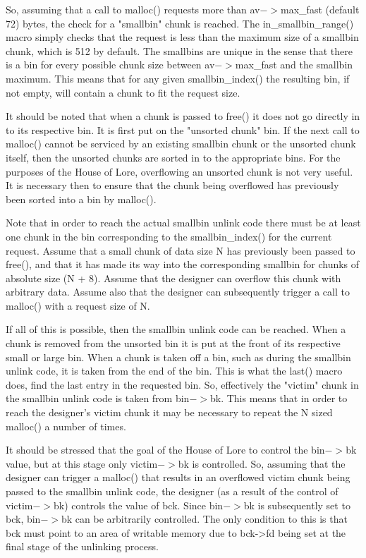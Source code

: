 \documentclass[12pt]{article}
\begin{document}
So, assuming that a call to malloc() requests more than av$->$max\_fast (default 72) bytes, the check for a "smallbin" chunk is
reached. The in\_smallbin\_range() macro simply checks that the
request is less than the maximum size of a smallbin chunk, which is
512 by default. The smallbins are unique in the sense that there is
a bin for every possible chunk size between av$->$max\_fast and the
smallbin maximum. This means that for any given smallbin\_index()
the resulting bin, if not empty, will contain a chunk to fit the
request size.
\newline


It should be noted that when a chunk is passed to free() it does
not go directly in to its respective bin. It is first put on the
"unsorted chunk" bin. If the next call to malloc() cannot be
serviced by an existing smallbin chunk or the unsorted chunk
itself, then the unsorted chunks are sorted in to the appropriate
bins. For the purposes of the House of Lore, overflowing an
unsorted chunk is not very useful. It is necessary then to ensure
that the chunk being overflowed has previously been sorted into a
bin by malloc().
\newline


Note that in order to reach the actual smallbin unlink code there
must be at least one chunk in the bin corresponding to the
smallbin\_index() for the current request. Assume that a small chunk
of data size N has previously been passed to free(), and that it
has made its way into the corresponding smallbin for chunks of
absolute size (N + 8). Assume that the designer can overflow this
chunk with arbitrary data. Assume also that the designer can
subsequently trigger a call to malloc() with a request size of N.
\newline


If all of this is possible, then the smallbin unlink code can be
reached. When a chunk is removed from the unsorted bin it is put at
the front of its respective small or large bin. When a chunk is
taken off a bin, such as during the smallbin unlink code, it is
taken from the end of the bin. This is what the last() macro does,
find the last entry in the requested bin. So, effectively the
"victim" chunk in the smallbin unlink code is taken from bin$->$bk.
This means that in order to reach the designer's victim chunk it
may be necessary to repeat the N sized malloc() a number of times.
\newline


It should be stressed that the goal of the House of Lore to control
the bin$->$bk value, but at this stage only victim$->$bk is controlled.
So, assuming that the designer can trigger a malloc() that results
in an overflowed victim chunk being passed to the smallbin unlink
code, the designer (as a result of the control of victim$->$bk)
controls the value of bck. Since bin$->$bk is subsequently set to
bck, bin$->$bk can be arbitrarily controlled. The only condition to
this is that bck must point to an area of writable memory due to
bck->fd being set at the final stage of the unlinking process.
\newline
\end{document}
